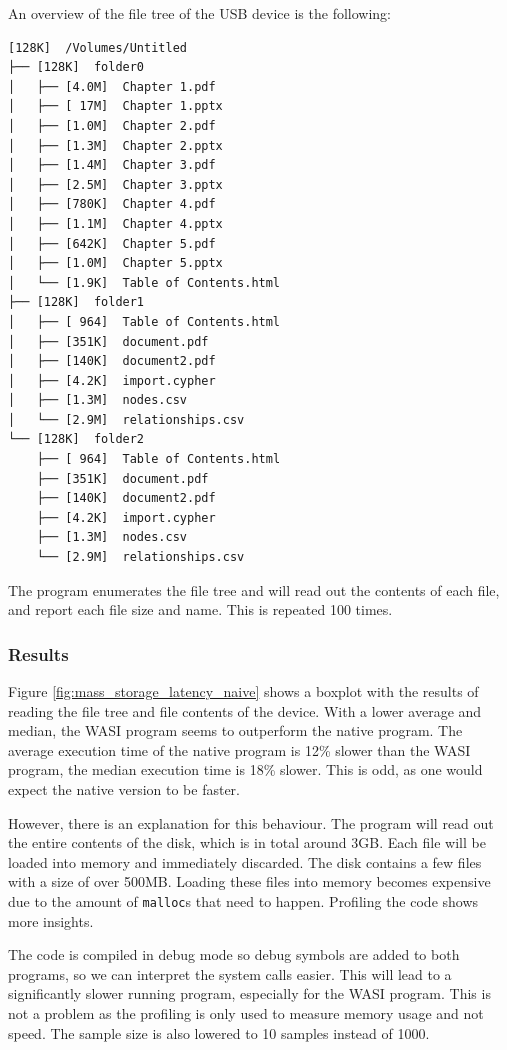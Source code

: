 An overview of the file tree of the USB device is the following:

\begin{verbatim}
[128K]  /Volumes/Untitled
├── [128K]  folder0
│   ├── [4.0M]  Chapter 1.pdf
│   ├── [ 17M]  Chapter 1.pptx
│   ├── [1.0M]  Chapter 2.pdf
│   ├── [1.3M]  Chapter 2.pptx
│   ├── [1.4M]  Chapter 3.pdf
│   ├── [2.5M]  Chapter 3.pptx
│   ├── [780K]  Chapter 4.pdf
│   ├── [1.1M]  Chapter 4.pptx
│   ├── [642K]  Chapter 5.pdf
│   ├── [1.0M]  Chapter 5.pptx
│   └── [1.9K]  Table of Contents.html
├── [128K]  folder1
│   ├── [ 964]  Table of Contents.html
│   ├── [351K]  document.pdf
│   ├── [140K]  document2.pdf
│   ├── [4.2K]  import.cypher
│   ├── [1.3M]  nodes.csv
│   └── [2.9M]  relationships.csv
└── [128K]  folder2
    ├── [ 964]  Table of Contents.html
    ├── [351K]  document.pdf
    ├── [140K]  document2.pdf
    ├── [4.2K]  import.cypher
    ├── [1.3M]  nodes.csv
    └── [2.9M]  relationships.csv
\end{verbatim}

The program enumerates the file tree and will read out the contents of each file, and report each file size and name. This is repeated 100 times.

\subsubsection{Results}

Figure \ref{fig:mass_storage_latency_naive} shows a boxplot with the results of reading the file tree and file contents of the device. With a lower average and median, the \acrshort{WASI} program seems to outperform the native program. The average execution time of the native program is 12\% slower than the \acrshort{WASI} program, the median execution time is 18\% slower. This is odd, as one would expect the native version to be faster.

However, there is an explanation for this behaviour. The program will read out the entire contents of the disk, which is in total around 3GB. Each file will be loaded into memory and immediately discarded. The disk contains a few files with a size of over 500MB. Loading these files into memory becomes expensive due to the amount of \texttt{malloc}s that need to happen. Profiling the code shows more insights.

The code is compiled in debug mode so debug symbols are added to both programs, so we can interpret the system calls easier. This will lead to a significantly slower running program, especially for the \acrshort{WASI} program. This is not a problem as the profiling is only used to measure memory usage and not speed. The sample size is also lowered to 10 samples instead of 1000.

